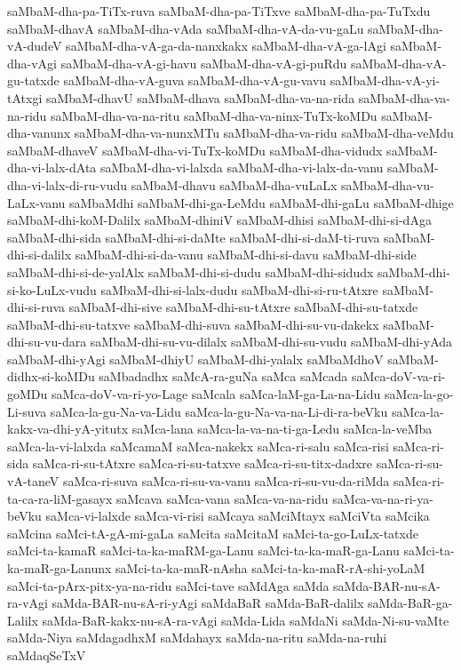 {saMbaM-dha-pa-TiTx-ruva
saMbaM-dha-pa-TiTxve
saMbaM-dha-pa-TuTxdu
saMbaM-dhavA
saMbaM-dha-vAda
saMbaM-dha-vA-da-vu-gaLu
saMbaM-dha-vA-dudeV
saMbaM-dha-vA-ga-da-nanxkakx
saMbaM-dha-vA-ga-lAgi
saMbaM-dha-vAgi
saMbaM-dha-vA-gi-havu
saMbaM-dha-vA-gi-puRdu
saMbaM-dha-vA-gu-tatxde
saMbaM-dha-vA-guva
saMbaM-dha-vA-gu-vavu
saMbaM-dha-vA-yi-tAtxgi
saMbaM-dhavU
saMbaM-dhava
saMbaM-dha-va-na-rida
saMbaM-dha-va-na-ridu
saMbaM-dha-va-na-ritu
saMbaM-dha-va-ninx-TuTx-koMDu
saMbaM-dha-vanunx
saMbaM-dha-va-nunxMTu
saMbaM-dha-va-ridu
saMbaM-dha-veMdu
saMbaM-dhaveV
saMbaM-dha-vi-TuTx-koMDu
saMbaM-dha-vidudx
saMbaM-dha-vi-lalx-dAta
saMbaM-dha-vi-lalxda
saMbaM-dha-vi-lalx-da-vanu
saMbaM-dha-vi-lalx-di-ru-vudu
saMbaM-dhavu
saMbaM-dha-vuLaLx
saMbaM-dha-vu-LaLx-vanu
saMbaMdhi
saMbaM-dhi-ga-LeMdu
saMbaM-dhi-gaLu
saMbaM-dhige
saMbaM-dhi-koM-Dalilx
saMbaM-dhiniV
saMbaM-dhisi
saMbaM-dhi-si-dAga
saMbaM-dhi-sida
saMbaM-dhi-si-daMte
saMbaM-dhi-si-daM-ti-ruva
saMbaM-dhi-si-dalilx
saMbaM-dhi-si-da-vanu
saMbaM-dhi-si-davu
saMbaM-dhi-side
saMbaM-dhi-si-de-yalAlx
saMbaM-dhi-si-dudu
saMbaM-dhi-sidudx
saMbaM-dhi-si-ko-LuLx-vudu
saMbaM-dhi-si-lalx-dudu
saMbaM-dhi-si-ru-tAtxre
saMbaM-dhi-si-ruva
saMbaM-dhi-sive
saMbaM-dhi-su-tAtxre
saMbaM-dhi-su-tatxde
saMbaM-dhi-su-tatxve
saMbaM-dhi-suva
saMbaM-dhi-su-vu-dakekx
saMbaM-dhi-su-vu-dara
saMbaM-dhi-su-vu-dilalx
saMbaM-dhi-su-vudu
saMbaM-dhi-yAda
saMbaM-dhi-yAgi
saMbaM-dhiyU
saMbaM-dhi-yalalx
saMbaMdhoV
saMbaM-didhx-si-koMDu
saMbadadhx
saMcA-ra-guNa
saMca
saMcada
saMca-doV-va-ri-goMDu
saMca-doV-va-ri-yo-Lage
saMcala
saMca-laM-ga-La-na-Lidu
saMca-la-go-Li-suva
saMca-la-gu-Na-va-Lidu
saMca-la-gu-Na-va-na-Li-di-ra-beVku
saMca-la-kakx-va-dhi-yA-yitutx
saMca-lana
saMca-la-va-na-ti-ga-Ledu
saMca-la-veMba
saMca-la-vi-lalxda
saMcamaM
saMca-nakekx
saMca-ri-salu
saMca-risi
saMca-ri-sida
saMca-ri-su-tAtxre
saMca-ri-su-tatxve
saMca-ri-su-titx-dadxre
saMca-ri-su-vA-taneV
saMca-ri-suva
saMca-ri-su-va-vanu
saMca-ri-su-vu-da-riMda
saMca-ri-ta-ca-ra-liM-gasayx
saMcava
saMca-vana
saMca-va-na-ridu
saMca-va-na-ri-ya-beVku
saMca-vi-lalxde
saMca-vi-risi
saMcaya
saMciMtayx
saMciVta
saMcika
saMcina
saMci-tA-gA-mi-gaLa
saMcita
saMcitaM
saMci-ta-go-LuLx-tatxde
saMci-ta-kamaR
saMci-ta-ka-maRM-ga-Lanu
saMci-ta-ka-maR-ga-Lanu
saMci-ta-ka-maR-ga-Lanunx
saMci-ta-ka-maR-nAsha
saMci-ta-ka-maR-rA-shi-yoLaM
saMci-ta-pArx-pitx-ya-na-ridu
saMci-tave
saMdAga
saMda
saMda-BAR-nu-sA-ra-vAgi
saMda-BAR-nu-sA-ri-yAgi
saMdaBaR
saMda-BaR-dalilx
saMda-BaR-ga-Lalilx
saMda-BaR-kakx-nu-sA-ra-vAgi
saMda-Lida
saMdaNi
saMda-Ni-su-vaMte
saMda-Niya
saMdagadhxM
saMdahayx
saMda-na-ritu
saMda-na-ruhi
saMdaqSeTxV
}
